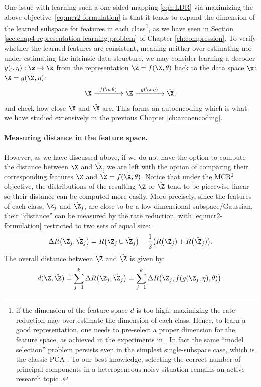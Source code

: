 \documentclass[../../book-main.tex]{subfiles}
\begin{document}
{One issue with learning such a one-sided  mapping \eqref{eqn:LDR} via  maximizing the above \mbox{objective \eqref{eq:mcr2-formulation}} is that it tends to expand the dimension of the learned subspace for features in each class\footnote{if the dimension of the feature space $d$ is too high, maximizing the rate reduction may over-estimate the dimension of each class. Hence, to learn a good representation, one needs to pre-select a proper dimension for the feature space, as achieved in the experiments in \cite{yu2020learning}. In fact the same ``model selection'' problem persists even in the simplest single-subspace case, which is the classic PCA \cite{Jolliffe1986}. To our best knowledge, selecting the correct number of principal components in a heterogeneous noisy situation remains an active research topic \cite{hong2020selecting}.}, as we have seen in Section \ref{sec:chap4-representation-learning-problem} of Chapter \ref{ch:compression}. To verify whether the learned features are consistent, meaning neither over-estimating nor under-estimating the intrinsic data structure, we may consider learning a decoder $g(\cdot,\eta): \z \mapsto  \x$ from the representation $\Z = f(\X,\theta)$ back to the data space $\x$: $\hat \X = g(\Z, \eta)$:
\begin{equation}
    \X \xrightarrow{\hspace{2mm} f(\x, \theta)\hspace{2mm}} \Z \xrightarrow{\hspace{2mm} g(\z,\eta) \hspace{2mm}} \hat \X, 
    \label{eqn:autoencoding-ch6}
\end{equation}
and check how close $\X$ and $\hat \X$ are. This forms an autoencoding which is  what we have studied extensively in the previous Chapter \ref{ch:autoencoding}.

\paragraph{Measuring distance in the feature space.}
However, as we have discussed above, if we do not have the option to compute the distance between $\X$ and $\hat \X$, we are left with the option of comparing their corresponding features $\Z$ and $\hat \Z = f(\hat \X, \theta)$. Notice that under the MCR$^2$ objective, the distributions of the resulting $\Z$ or $\hat \Z$ tend to be piecewise linear so  their distance can be  computed more easily. More precisely, since the features of each class, $\Z_j$ and $\hat{\Z}_j$, are close to be a low-dimensional subspace/Gaussian, their ``distance'' can be measured by the rate reduction, {with \eqref{eq:mcr2-formulation} restricted to two sets of equal size}:
\begin{equation}
\Delta R\big(\Z_j, \hat{\Z}_j\big) \doteq R\big(\Z_j \cup \hat{\Z}_j\big) - \frac{1}{2} \big( R\big(\Z_j) + R\big(\hat \Z_j)\big).
\end{equation}
The overall distance between $\Z$ and $\hat \Z$ is given by:
\begin{equation}
d(\Z, \hat \Z) \doteq   \sum_{j=1}^k \Delta R\big(\Z_j, \hat{\Z}_j\big) =  \sum_{j=1}^k \Delta R\big(\Z_j, f(g(\Z_j, \eta),\theta)\big).
\label{eqn:Z-distance}
\end{equation}


}
\end{document}
